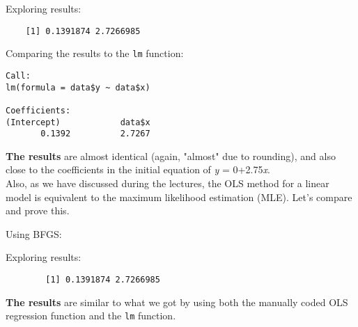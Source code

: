 \documentclass[12pt,letterpaper]{article}
\begin{document}
Exploring results:
 

\begin{verbatim}
	[1] 0.1391874 2.7266985
\end{verbatim}

	Comparing the results to the \texttt{lm} function: 
	
	 
	
	\begin{verbatim}
Call:
lm(formula = data$y ~ data$x)

Coefficients:
(Intercept)            data$x
       0.1392          2.7267 
	\end{verbatim}
	
\textbf{The results } are almost identical (again, "almost" due to rounding), and also close to the coefficients in the initial equation of \textit{y} = 0+2.75\textit{x}. \\

Also, as we have discussed during the lectures, the OLS method for a linear model is equivalent to the maximum likelihood estimation (MLE). Let's compare and prove this.
	 

Using BFGS:
	
	
Exploring results:
	 
	
	\begin{verbatim}
		[1] 0.1391874 2.7266985
	\end{verbatim}
	

\textbf{The results } are similar to what we got by using both the manually coded OLS regression function and  the \texttt{lm} function.
\end{document}
